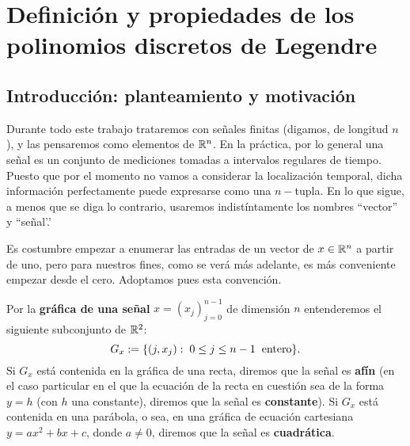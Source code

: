 \chapter{Definición y propiedades de los polinomios discretos de Legendre}
\label{cap: def y propiedades de los pol discretos de Legendre}
\label{cap: def de los pol de legendre discretos}

\section{Introducción: planteamiento y motivación}
Durante todo este trabajo trataremos con señales
finitas
(digamos, de
longitud $n$), y las pensaremos como elementos de $\mathbb{R}^{n}$.
En la práctica, por lo general
una señal es un conjunto de mediciones tomadas
a intervalos regulares de tiempo.
Puesto que por el momento no vamos
a considerar la localización temporal, dicha
información perfectamente puede expresarse como 
una $n-$tupla. En lo que sigue, a menos que se diga
lo contrario, usaremos indistíntamente los nombres
``vector'' y ``señal'.'

Es costumbre empezar
a enumerar las entradas de un vector
de $x \in \mathbb{R}^{n}$ a partir de uno, pero
para nuestros fines,
como se verá más adelante, es más 
conveniente empezar desde el cero.
Adoptamos pues esta convención.


\begin{defi}
\label{def: grafica senial}
Por la \textbf{gráfica de una señal} $x=(x_{j})_{j=0}^{n-1}$
de dimensión $n$ entenderemos
 el siguiente subconjunto de $\mathbb{R}^{2}$:
\[
G_{x} := 
\{ (j, x_{j} ) : \hspace{0.1cm} 0 \leq j \leq n-1
\hspace{0.2cm} \text{entero}\} .
\]
Si $G_{x}$ está contenida en la gráfica de una recta, diremos que la
señal es \textbf{afín}
(en el caso particular en el que
la ecuación de la recta en cuestión sea de la forma $y= h$
(con $h$ una constante),
diremos que la señal es
\textbf{constante}). Si  $G_{x}$ está contenida en 
una parábola, o sea, en una
gráfica de ecuación cartesiana
$y=ax^{2}+ bx +c$, donde $a \neq 0$, diremos 
que la señal es \textbf{cuadrática}.
\end{defi}


